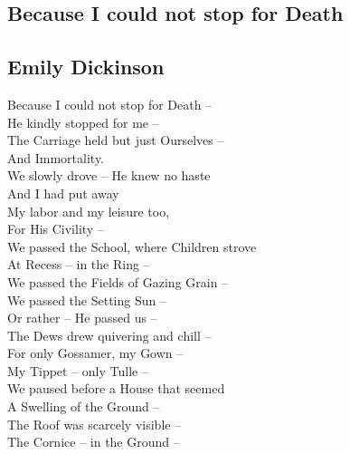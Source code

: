 \documentclass[a4,12pt]{article}
\begin{document}
\begin{center}
        \newpage
        \section*{Because I could not stop for Death}
        \label{sec:Because I could not stop for Death}
        \subsection*{Emily Dickinson}

        \vspace{15pt}
        Because I could not stop for Death –\\
        He kindly stopped for me –\\
        The Carriage held but just Ourselves –\\
        And Immortality.\\

        \vspace{15pt}
        We slowly drove – He knew no haste\\
        And I had put away\\
        My labor and my leisure too,\\
        For His Civility –\\

        \vspace{15pt}
        We passed the School, where Children strove\\
        At Recess – in the Ring –\\
        We passed the Fields of Gazing Grain –\\
        We passed the Setting Sun –\\

        \vspace{15pt}
        Or rather – He passed us –\\
        The Dews drew quivering and chill –\\
        For only Gossamer, my Gown –\\
        My Tippet – only Tulle –\\

        \vspace{15pt}
        We paused before a House that seemed\\
        A Swelling of the Ground –\\
        The Roof was scarcely visible –\\
        The Cornice – in the Ground –\\


\end{center}
\end{document}
